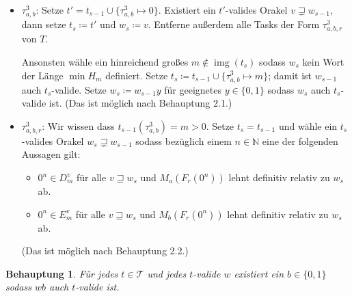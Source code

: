 \documentclass[nofonts]{uebung}
\newtheorem{claim}[theorem]{Behauptung}
\theoremstyle{definition}
\DeclareMathOperator{\img}{img}
\begin{document}
\begin{itemize}
    \item $\tau^3_{a,b}$: Setze $t'=t_{s-1}\cup\{\tau^3_{a,b}\mapsto 0\}$. Existiert ein $t'$-valides Orakel $v\sqsupsetneq w_{s-1}$, dann setze $t_s\coloneqq t'$ und $w_s\coloneqq v$. Entferne außerdem alle Tasks der Form $\tau^3_{a,b,r}$ von $T$.

        Ansonsten wähle ein hinreichend großes $m\not\in \img(t_s)$ sodass $w_s$ kein Wort der Länge $\min H_m$ definiert. Setze $t_s\coloneqq t_{s-1}\cup \{ \tau^3_{a,b}\mapsto m \}$; damit ist $w_{s-1}$ auch $t_s$-valide. Setze $w_s\coloneqq w_{s-1}y$ für geeignetes $y\in\{0,1\}$ sodass $w_s$ auch $t_s$-valide ist. (Das ist möglich nach Behauptung 2.1.)

    \item $\tau^3_{a,b,r}$: Wir wissen dass $t_{s-1}(\tau^3_{a,b})=m>0$. Setze $t_s=t_{s-1}$ und wähle ein $t_s$-valides Orakel $w_s\sqsupsetneq w_{s-1}$ sodass bezüglich einem $n\in\mathbb N$ eine der folgenden Aussagen gilt:
        \begin{itemize}[nosep,endpenalty=10000]
            \item $0^n\in D_m^v$ für alle $v\sqsupseteq w_s$ und $M_a(F_r(0^n))$ lehnt definitiv relativ zu $w_s$ ab.
            \item $0^n\in E_m^v$ für alle $v\sqsupseteq w_s$ und $M_b(F_r(0^n))$ lehnt definitiv relativ zu $w_s$ ab.
        \end{itemize} (Das ist möglich nach Behauptung 2.2.)
\end{itemize}

\begin{claim}
    Für jedes $t\in\mathcal T$ und jedes $t$-valide $w$ existiert ein $b\in\{0,1\}$ sodass $wb$ auch $t$-valide ist.
\end{claim}
\end{document}
